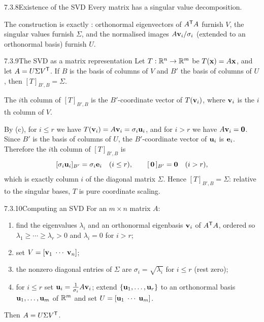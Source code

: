 \begin{thms}{7.3.8}{Existence of the SVD}
Every matrix has a singular value decomposition.
\end{thms}

\begin{proofomit}[MTH2025]The construction is exactly : orthonormal eigenvectors of $A^{\mathsf{T}} A$ furnish $V$, the singular values furnish $\Sigma$, and the normalised images $A\mathbf{v}_i/\sigma_i$ (extended to an orthonormal basis) furnish $U$.
\end{proofomit}

\begin{thms}{7.3.9}{The SVD as a matrix representation}
Let $T:\mathbb{R}^n\to\mathbb{R}^m$ be $T(\mathbf{x})=A\mathbf{x}$, and let $A=U\Sigma V^{\mathsf{T}}$. If $B$ is the basis of columns of $V$ and $B'$ the basis of columns of $U$, then $[T]_{B',B}=\Sigma$.
\end{thms}

\begin{prf}
The $i$th column of $[T]_{B',B}$ is the $B'$-coordinate vector of $T(\mathbf{v}_i)$, where $\mathbf{v}_i$ is the $i$th column of $V$.

By (c), for $i\le r$ we have $T(\mathbf{v}_i)=A\mathbf{v}_i=\sigma_i\mathbf{u}_i$, and for $i>r$ we have $A\mathbf{v}_i=\mathbf{0}$. Since $B'$ is the basis of columns of $U$, the $B'$-coordinate vector of $\mathbf{u}_i$ is $\mathbf{e}_i$. Therefore the $i$th column of $[T]_{B',B}$ is
\[
[\sigma_i\mathbf{u}_i]_{B'}=\sigma_i\mathbf{e}_i\quad(i\le r),\qquad [\,\mathbf{0}\,]_{B'}=\mathbf{0}\quad(i>r),
\]
which is exactly column $i$ of the diagonal matrix $\Sigma$. Hence $[T]_{B',B}=\Sigma$: relative to the singular bases, $T$ is pure coordinate scaling.
\end{prf}

\begin{algs}{7.3.10}{Computing an SVD}
For an $m\times n$ matrix $A$:
\begin{enumerate}[label=\textup{(\roman*)},leftmargin=2.4em,itemsep=1pt]
\item find the eigenvalues $\lambda_i$ and an orthonormal eigenbasis $\mathbf{v}_i$ of $A^{\mathsf{T}} A$, ordered so $\lambda_1\ge\cdots\ge\lambda_r>0$ and $\lambda_i=0$ for $i>r$;
\item set $V=[\mathbf{v}_1\;\cdots\;\mathbf{v}_n]$;
\item the nonzero diagonal entries of $\Sigma$ are $\sigma_i=\sqrt{\lambda_i}$ for $i\le r$ (rest zero);
\item for $i\le r$ set $\mathbf{u}_i=\tfrac{1}{\sigma_i}A\mathbf{v}_i$; extend $\{\mathbf{u}_1,\dots,\mathbf{u}_r\}$ to an orthonormal basis $\mathbf{u}_1,\dots,\mathbf{u}_m$ of $\mathbb{R}^m$ and set $U=[\mathbf{u}_1\;\cdots\;\mathbf{u}_m]$.
\end{enumerate}
Then $A=U\Sigma V^{\mathsf{T}}$.
\end{algs}


